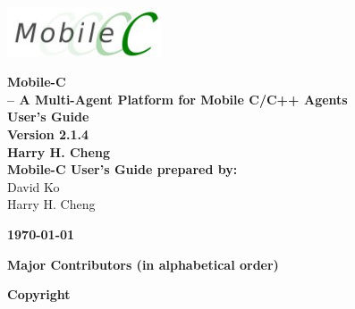 \documentclass[11pt]{report}
\begin{document}
\thispagestyle{empty}
\begin{center}
\includegraphics[width=1.8in]{figure/mobilec_logo.png}


\vspace{0.5in}
{\Huge\sf\bf Mobile-C} \\
\vspace{0.1in}
{\LARGE\sf\bf -- A Multi-Agent Platform for Mobile C/C++ Agents} \\
\vspace{0.4in}
{\LARGE\sf\bf User's Guide} \\
\vspace{0.4in}
{\LARGE\sf\bf Version 2.1.4} \\
\vspace{1.0in}
{\Large\sf\bf Harry H. Cheng} \\
\vspace{1.0in}
{\large\sf\bf Mobile-C User's Guide prepared by:} \\
\vspace{0.2in}
David Ko\\
Harry H. Cheng
\vspace{1in}

\vspace{2.0in}
{\large\sf\bf\today}
\end{center}

\pagebreak
\noindent
{\LARGE\sf\bf Major Contributors (in alphabetical order)} \\
{\small

}
\pagebreak


\thispagestyle{empty}
\noindent
{\Large\bf Copyright}\\


\pagebreak
\end{document}

